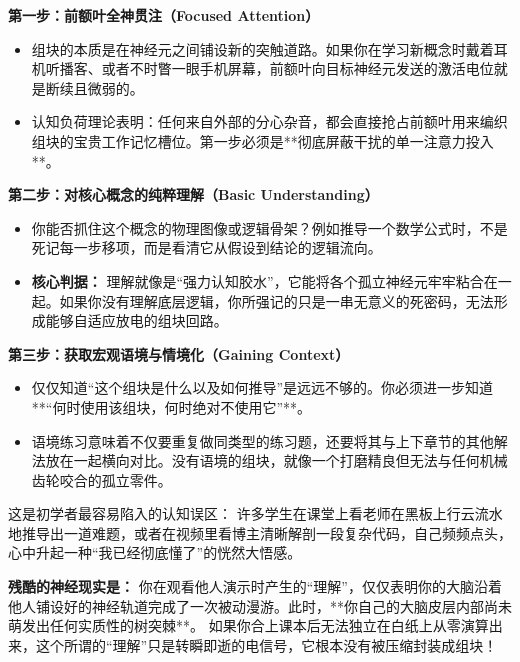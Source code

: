 \documentclass[12pt,a4paper,openany]{ctexbook}
\begin{document}
\begin{practicebox}
\textbf{第一步：前额叶全神贯注（Focused Attention）}
\begin{itemize}
    \item 组块的本质是在神经元之间铺设新的突触道路。如果你在学习新概念时戴着耳机听播客、或者不时瞥一眼手机屏幕，前额叶向目标神经元发送的激活电位就是断续且微弱的。
    \item 认知负荷理论表明：任何来自外部的分心杂音，都会直接抢占前额叶用来编织组块的宝贵工作记忆槽位。第一步必须是**彻底屏蔽干扰的单一注意力投入**。
\end{itemize}

\textbf{第二步：对核心概念的纯粹理解（Basic Understanding）}
\begin{itemize}
    \item 你能否抓住这个概念的物理图像或逻辑骨架？例如推导一个数学公式时，不是死记每一步移项，而是看清它从假设到结论的逻辑流向。
    \item \textbf{核心判据：} 理解就像是“强力认知胶水”，它能将各个孤立神经元牢牢粘合在一起。如果你没有理解底层逻辑，你所强记的只是一串无意义的死密码，无法形成能够自适应放电的组块回路。
\end{itemize}

\textbf{第三步：获取宏观语境与情境化（Gaining Context）}
\begin{itemize}
    \item 仅仅知道“这个组块是什么以及如何推导”是远远不够的。你必须进一步知道**“何时使用该组块，何时绝对不使用它”**。
    \item 语境练习意味着不仅要重复做同类型的练习题，还要将其与上下章节的其他解法放在一起横向对比。没有语境的组块，就像一个打磨精良但无法与任何机械齿轮咬合的孤立零件。
\end{itemize}
\end{practicebox}

\begin{warningbox}
这是初学者最容易陷入的认知误区：
许多学生在课堂上看老师在黑板上行云流水地推导出一道难题，或者在视频里看博主清晰解剖一段复杂代码，自己频频点头，心中升起一种“我已经彻底懂了”的恍然大悟感。

\textbf{残酷的神经现实是：}
你在观看他人演示时产生的“理解”，仅仅表明你的大脑沿着他人铺设好的神经轨道完成了一次被动漫游。此时，**你自己的大脑皮层内部尚未萌发出任何实质性的树突棘**。
如果你合上课本后无法独立在白纸上从零演算出来，这个所谓的“理解”只是转瞬即逝的电信号，它根本没有被压缩封装成组块！
\end{warningbox}
\end{document}
